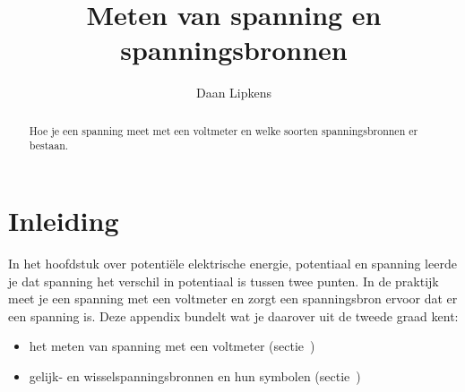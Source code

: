 \documentclass{ximera}
\title{Meten van spanning en spanningsbronnen}
\author{Daan Lipkens}
\begin{document}
\begin{abstract}
    Hoe je een spanning meet met een voltmeter en welke soorten spanningsbronnen er bestaan.
\end{abstract}
\maketitle
\label{hoofdstuk:appendix_spanning}

\section*{Inleiding}
In het hoofdstuk over potentiële elektrische energie, potentiaal en spanning leerde je dat spanning het verschil in potentiaal is tussen twee punten. In de praktijk meet je een spanning met een voltmeter en zorgt een spanningsbron ervoor dat er een spanning is. Deze appendix bundelt wat je daarover uit de tweede graad kent:
\begin{itemize}
    \item het meten van spanning met een voltmeter (sectie~)
    \item gelijk- en wisselspanningsbronnen en hun symbolen (sectie~)
\end{itemize}
\end{document}
